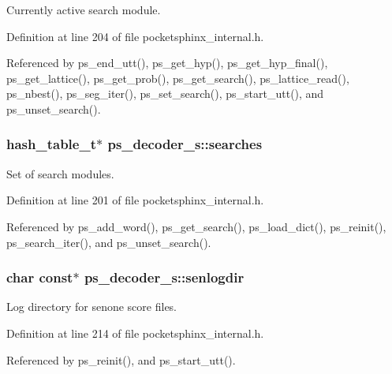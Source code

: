 Currently active search module. 



Definition at line 204 of file pocketsphinx\+\_\+internal.\+h.



Referenced by ps\+\_\+end\+\_\+utt(), ps\+\_\+get\+\_\+hyp(), ps\+\_\+get\+\_\+hyp\+\_\+final(), ps\+\_\+get\+\_\+lattice(), ps\+\_\+get\+\_\+prob(), ps\+\_\+get\+\_\+search(), ps\+\_\+lattice\+\_\+read(), ps\+\_\+nbest(), ps\+\_\+seg\+\_\+iter(), ps\+\_\+set\+\_\+search(), ps\+\_\+start\+\_\+utt(), and ps\+\_\+unset\+\_\+search().

\subsubsection[{searches}]{\setlength{\rightskip}{0pt plus 5cm}hash\+\_\+table\+\_\+t$\ast$ ps\+\_\+decoder\+\_\+s\+::searches}\label{structps__decoder__s_a43bca42790684eefb8d01a0aef6fa530}


Set of search modules. 



Definition at line 201 of file pocketsphinx\+\_\+internal.\+h.



Referenced by ps\+\_\+add\+\_\+word(), ps\+\_\+get\+\_\+search(), ps\+\_\+load\+\_\+dict(), ps\+\_\+reinit(), ps\+\_\+search\+\_\+iter(), and ps\+\_\+unset\+\_\+search().

\subsubsection[{senlogdir}]{\setlength{\rightskip}{0pt plus 5cm}char const$\ast$ ps\+\_\+decoder\+\_\+s\+::senlogdir}\label{structps__decoder__s_a0ed3476113fe3d63b13ac5e8da3f3b4f}


Log directory for senone score files. 



Definition at line 214 of file pocketsphinx\+\_\+internal.\+h.



Referenced by ps\+\_\+reinit(), and ps\+\_\+start\+\_\+utt().

